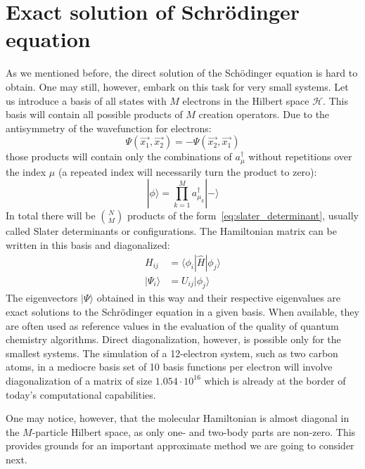 \section{Exact solution of Schr{\"o}dinger equation}
As we mentioned before, the direct solution of the Sch{\"o}dinger equation is 
hard to obtain. One may still, however, embark on this task for very small 
systems. Let us introduce a basis of all states with $M$ electrons in the 
Hilbert space $\mathcal{H}$. This basis will contain all possible products of 
$M$ creation operators. Due to the antisymmetry of the 
wavefunction for electrons:
%
\begin{equation}
  \Psi(\vec{x_{1}}, \vec{x_{2}}) = - \Psi(\vec{x_{2}}, \vec{x_{1}}) 
\end{equation}
%
those products will contain only the combinations of $a^{\dagger}_{\mu}$ 
without repetitions over the index $\mu$ (a repeated index will necessarily 
turn the product to zero):
%
\begin{equation}
 | \phi \rangle = \prod_{k=1}^{M} a^{\dagger}_{\mu_{k}} |- \rangle  
 \label{eq:slater_determinant}
\end{equation}
%
In total there will be $N \choose M$ products of the
form~\ref{eq:slater_determinant}, usually called Slater determinants or 
configurations. The Hamiltonian matrix can be written in this basis and 
diagonalized:
%
\begin{equation}
\begin{aligned}
 H_{ij} &= \langle \phi_{i} | \hat{H} | \phi_{j} \rangle \\
 | \Psi_{i} \rangle &= U_{ij} |\phi_{j} \rangle
\end{aligned}
\end{equation}
%
The eigenvectors $| \Psi \rangle$ obtained in this way and their respective 
eigenvalues are exact solutions to the Schr{\"o}dinger equation in a given 
basis. When available, they are often used as reference values in the
evaluation of the quality of quantum chemistry algorithms. Direct 
diagonalization, however, is possible only for the smallest systems. The 
simulation of a 12-electron system, such as two carbon atoms, in a mediocre 
basis set of 10 basis functions per electron will involve diagonalization of 
a matrix of size $1.054 \cdot 10^{16}$ which is already at the border of 
today's computational capabilities.

One may notice, however, that the molecular Hamiltonian is almost diagonal in 
the $M$-particle Hilbert space, as only one- and two-body parts are non-zero. 
This provides grounds for an important approximate method we are going to 
consider next. 

